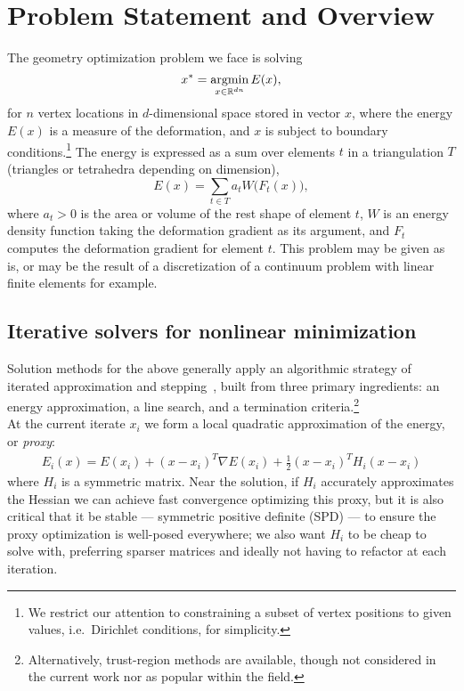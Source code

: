 \section{Problem Statement and Overview}

The geometry optimization problem we face is solving
\begin{equation}
    x^* = \mathop{\rm argmin}_{x\in \mathbb{R}^{dn}} E(x),
\end{equation}
for $n$ vertex locations in $d$-dimensional space stored in vector $x$,
where the energy $E(x)$ is a measure of the deformation, and $x$
is subject to boundary conditions.\footnote{We restrict our attention to
constraining a subset of vertex positions to given values, i.e.\ Dirichlet conditions,
for simplicity.} The energy is expressed as a sum over elements $t$ in a triangulation $T$
(triangles or tetrahedra depending on dimension),
\begin{equation}
\label{eq:obj}
E(x) = \sum_{t \in T} a_t W\big( F_t(x) \big),
\end{equation}
where $a_t>0$ is the area or volume of the rest shape of element $t$, $W$ is an energy
density function taking the deformation gradient as its argument, and $F_t$ computes the
deformation gradient for element $t$.
This problem may be given as is, or may be the result of a discretization of
a continuum problem with linear finite elements for example.


\subsection{Iterative solvers for nonlinear minimization}

Solution methods for the above generally apply an algorithmic strategy of iterated
approximation and stepping~\cite{Bertsekas:2016:NOP}, built
from three primary ingredients: an energy approximation, a
line search, and a termination criteria.\footnote{Alternatively, trust-region
methods are available, though not considered in the current work nor as
popular within the field.} \\

 At the current iterate $x_i$ we form a
local quadratic approximation of the energy, or \emph{proxy}:
\begin{align}
\label{eq:quad_approx}
E_i(x) = E(x_i) +   (x - x_i)^T \nabla E(x_i)  + \tfrac{1}{2}  (x - x_i) ^T H_i (x - x_i)
\end{align} where $H_i$ is a symmetric matrix.
Near the solution, if $H_i$ accurately approximates the Hessian we can achieve
fast convergence optimizing this proxy, but it is also critical that
it be stable --- symmetric positive definite (SPD) --- to ensure the proxy
optimization is well-posed everywhere; we also want $H_i$ to be cheap to solve with,
preferring sparser matrices and ideally not having to refactor at each iteration. \\

